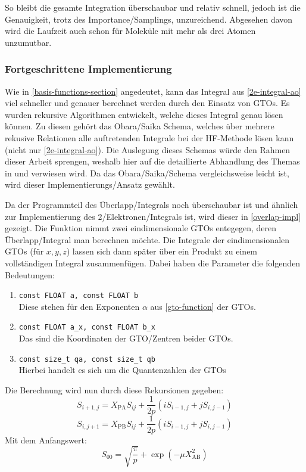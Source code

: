 So bleibt die gesamte Integration überschaubar und relativ schnell,
jedoch ist die Genauigkeit, trotz des Importance\-/Samplings, unzureichend.
Abgesehen davon wird die Laufzeit auch schon für Moleküle mit mehr als drei Atomen unzumutbar.

\subsubsection{Fortgeschrittene Implementierung}

Wie in \cref{basis-functions-section} angedeutet, kann das Integral aus \cref{2e-integral-ao}
viel schneller und genauer berechnet werden durch den Einsatz von GTOs.
Es wurden rekursive Algorithmen entwickelt, welche dieses Integral genau lösen können.
Zu diesen gehört das Obara\-/Saika Schema, welches über mehrere rekusive Relationen alle
auftretenden Integrale bei der HF-Methode lösen kann (nicht nur \cref{2e-integral-ao}).
Die Auslegung dieses Schemas würde den Rahmen dieser Arbeit sprengen,
weshalb hier auf die detaillierte Abhandlung des Themas in
\cite[Kapitel 9 bzw. 9.10]{structure_2013} und \cite{obara_saika_1988} verwiesen wird.
Da das Obara\-/Saika\-/Schema vergleichsweise leicht ist, wird dieser Implementierungs\-/Ansatz 
gewählt.

Da der Programmteil des Überlapp\-/Integrals noch überschaubar ist und ähnlich zur Implementierung
des 2\-/Elektronen\-/Integrals ist, wird dieser in \cref{overlap-impl} gezeigt. Die Funktion nimmt
zwei eindimensionale GTOs entegegen, deren Überlapp\-/Integral man berechnen möchte.
Die Integrale der eindimensionalen GTOs (für $x,y,z$) lassen sich dann später über ein Produkt
zu einem vollständigen Integral zusammenfügen. Dabei haben die Parameter die folgenden Bedeutungen:
\begin{enumerate}
    \item \texttt{const FLOAT a, const FLOAT b}\\
    Diese stehen für den Exponenten $\alpha$ aus \cref{gto-function} der GTOs.
    \item \texttt{const FLOAT a_x, const FLOAT b_x}\\
    Das sind die Koordinaten der GTO\-/Zentren beider GTOs.
    \item \texttt{const size_t qa, const size_t qb}\\
    Hierbei handelt es sich um die Quantenzahlen der GTOs
\end{enumerate}

Die Berechnung wird nun durch diese Rekursionen gegeben:
\begin{equation}
    S_{i+1,j} = X_\text{PA}S_{ij} + \frac{1}{2p}(iS_{i-1,j} + jS_{i,j-1})
\end{equation}
\begin{equation}
    S_{i,j+1} = X_\text{PB}S_{ij} + \frac{1}{2p}(iS_{i-1,j} + jS_{i,j-1})
\end{equation}
Mit dem Anfangswert:
\begin{equation}
    S_{00} = \sqrt{\frac{\pi}{p}} + \exp(-\mu X^2_\text{AB})
\end{equation}

